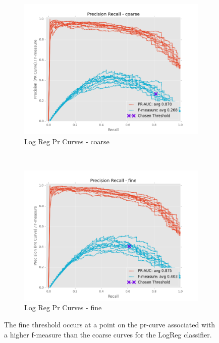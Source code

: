 \documentclass[ms]{nuthesis}
\begin{document}
\FloatBarrier
\begin{figure}[!htb]
    \centering
    \begin{subfigure}[t]{0.5\textwidth}
        \centering
        \includegraphics[width=\textwidth]{fig/LogReg_FindThreshold_PrCurve_coarse}
        \caption{Log Reg Pr Curves - coarse}
    \end{subfigure}%
    ~
    \begin{subfigure}[t]{0.5\textwidth}
        \centering
        \includegraphics[width=\textwidth]{fig/LogReg_FindThreshold_PrCurve_fine}
        \caption{Log Reg Pr Curves - fine}
    \end{subfigure}
    \caption{The fine threshold occurs at a point on the pr-curve associated with a higher
    f-measure than the coarse curves for the LogReg classifier.}
    \label{fig:LogRegThreshPr}
\end{figure}
\FloatBarrier
\end{document}
